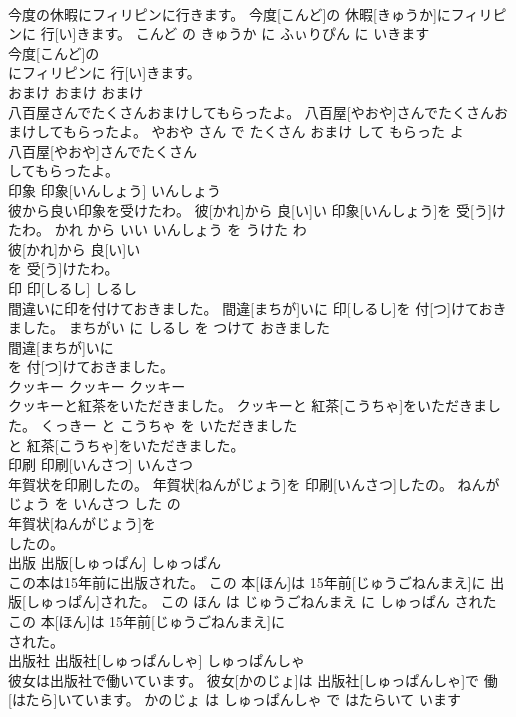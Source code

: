 \documentclass[8pt]{extreport}
\begin{document}
\begin{CJK}{UTF8}{min}
\\	今度の休暇にフィリピンに行きます。	今度[こんど]の 休暇[きゅうか]にフィリピンに 行[い]きます。	こんど の きゅうか に ふぃりぴん に いきます	
\\	今度[こんど]の
\\	にフィリピンに 行[い]きます。			
\\	おまけ	おまけ	おまけ	
\\	八百屋さんでたくさんおまけしてもらったよ。	八百屋[やおや]さんでたくさんおまけしてもらったよ。	やおや さん で たくさん おまけ して もらった よ	
\\	八百屋[やおや]さんでたくさん
\\	してもらったよ。			
\\	印象	印象[いんしょう]	いんしょう	
\\	彼から良い印象を受けたわ。	彼[かれ]から 良[い]い 印象[いんしょう]を 受[う]けたわ。	かれ から いい いんしょう を うけた わ	
\\	彼[かれ]から 良[い]い
\\	を 受[う]けたわ。			
\\	印	印[しるし]	しるし	
\\	間違いに印を付けておきました。	間違[まちが]いに 印[しるし]を 付[つ]けておきました。	まちがい に しるし を つけて おきました	
\\	間違[まちが]いに
\\	を 付[つ]けておきました。			
\\	クッキー	クッキー	クッキー	
\\	クッキーと紅茶をいただきました。	クッキーと 紅茶[こうちゃ]をいただきました。	くっきー と こうちゃ を いただきました	
\\	と 紅茶[こうちゃ]をいただきました。			
\\	印刷	印刷[いんさつ]	いんさつ	
\\	年賀状を印刷したの。	年賀状[ねんがじょう]を 印刷[いんさつ]したの。	ねんがじょう を いんさつ した の	
\\	年賀状[ねんがじょう]を
\\	したの。			
\\	出版	出版[しゅっぱん]	しゅっぱん	
\\	この本は15年前に出版された。	この 本[ほん]は 15年前[じゅうごねんまえ]に 出版[しゅっぱん]された。	この ほん は じゅうごねんまえ に しゅっぱん された	
\\	この 本[ほん]は 15年前[じゅうごねんまえ]に
\\	された。			
\\	出版社	出版社[しゅっぱんしゃ]	しゅっぱんしゃ	
\\	彼女は出版社で働いています。	彼女[かのじょ]は 出版社[しゅっぱんしゃ]で 働[はたら]いています。	かのじょ は しゅっぱんしゃ で はたらいて います	

\end{CJK}
\end{document}
